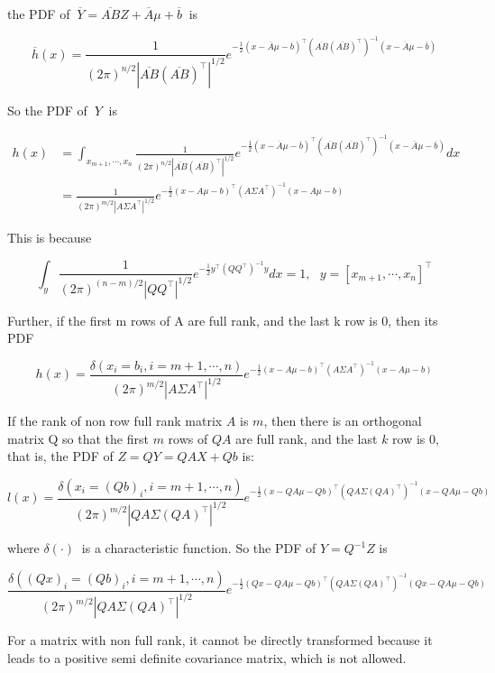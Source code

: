 \documentclass[11pt,a4paper]{report}
\theoremstyle{definition}\newtheorem{exercise}{Exercise}[chapter]
\begin{document}
\begin{answer}
    the PDF of \(\ \overline{Y} = \overline{AB}Z + \overline{A}\mu + \overline{b}\ \) is
    
    \[\overline{h}(x) = \frac{1}{(2\pi)^{n/2}\left| \overline{AB}\left( \overline{AB} \right)^{\top} \right|^{1/2}}e^{- \frac{1}{2}\left( x - \overline{A}\mu - \overline{b} \right)^{\top}\left( \overline{AB}\left( \overline{AB} \right)^{\top} \right)^{- 1}\left( x - \overline{A}\mu - \overline{b} \right)}\]
    
    So the PDF of \(\ Y\ \) is
    
    \begin{align*}
    h(x) &= \int_{x_{m + 1},\cdots,x_{n}}^{}{\frac{1}{(2\pi)^{n/2}\left| \overline{AB}\left( \overline{AB} \right)^{\top} \right|^{1/2}}e^{- \frac{1}{2}\left( x - \overline{A}\mu - \overline{b} \right)^{\top}\left( \overline{AB}\left( \overline{AB} \right)^{\top} \right)^{- 1}\left( x - \overline{A}\mu - \overline{b} \right)}}dx\\
    &= \frac{1}{(2\pi)^{m/2}\left| A\Sigma A^{\top} \right|^{1/2}}e^{- \frac{1}{2}(x - A\mu - b)^{\top}{(A\Sigma A^{\top})}^{- 1}(x - A\mu - b)}
    \end{align*}
    
    This is because
    
    \[\int_{y}^{}{\frac{1}{(2\pi)^{(n - m)/2}\left| QQ^{\top} \right|^{1/2}}e^{- \frac{1}{2}y^{\top}\left( QQ^{\top} \right)^{- 1}y}}dx = 1,\ \ \ y = \left\lbrack x_{m + 1},\cdots,x_{n} \right\rbrack^{\top}\]
    
    Further, if the first m rows of A are full rank, and the last k row is 0, then its PDF
    
    \[h(x) = \frac{\delta(x_{i} = b_{i},i = m + 1,\cdots,n)}{(2\pi)^{m/2}\left| A\Sigma A^{\top} \right|^{1/2}}e^{- \frac{1}{2}(x - A\mu - b)^{\top}{(A\Sigma A^{\top})}^{- 1}(x - A\mu - b)}\]
    
    If the rank of non row full rank matrix $A$ is $m$, then there is an orthogonal matrix Q so that the first $m$ rows of $QA$ are full rank, and the last $k$ row is 0, that is, the PDF of \( Z=QY=QAX+Qb \) is:
    
    \[l(x) = \frac{\delta(x_{i} = (Qb)_{i},i = m + 1,\cdots,n)}{(2\pi)^{m/2}\left| QA\Sigma{(QA)}^{\top} \right|^{1/2}}e^{- \frac{1}{2}(x - QA\mu - Qb)^{\top}\left( QA\Sigma(QA)^{\top} \right)^{- 1}(x - QA\mu - Qb)}\]
    
    where \(\delta( \cdot )\ \) is a characteristic function. So the PDF of \( Y=Q ^ {- 1} Z \) is
    
    \[\frac{\delta({(Qx)}_{i} = (Qb)_{i},i = m + 1,\cdots,n)}{(2\pi)^{m/2}\left| QA\Sigma{(QA)}^{\top} \right|^{1/2}}e^{- \frac{1}{2}(Qx - QA\mu - Qb)^{\top}\left( QA\Sigma(QA)^{\top} \right)^{- 1}(Qx - QA\mu - Qb)}\]
    
    For a matrix with non full rank, it cannot be directly transformed because it leads to a positive semi definite covariance matrix, which is not allowed.
\end{answer}
\end{document}
